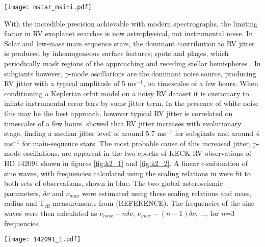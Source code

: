 \documentclass[useAMS, usenatbib]{aastex}
\begin{document}
\begin{figure*}
\begin{center}
\texttt{[image: mstar\_msini.pdf]}
\caption{Host star mass vs minimum masses for planets with orbital solutions
listed in the {\it Exoplanet.org}. In this study we are targeting the blue
region.}
\label{fig:mstar_msini}
\end{center}
\end{figure*}

With the incredible precision achievable with modern spectrographs, the
limiting factor in RV exoplanet searches is now astrophysical, not
instrumental noise.
In Solar and low-mass main sequence stars, the dominant contribution to RV
jitter is produced by inhomogeneous surface features; spots and plages, which
periodically mask regions of the approaching and receding stellar hemispheres \citep{Aigrain2012, Dumusque2011, Haywood2014}.
In subgiants however, p-mode oscillations are the dominant noise
source, producing RV jitter with a typical amplitude of 5 ms$^{-1}$, on
timescales of a few hours.
When conditioning a Keplerian orbit model on a noisy RV dataset it is
customary to inflate instrumental error bars by some jitter term. In the
presence of white noise this may be the best approach, however typical RV
jitter is correlated on timescales of a few hours.
\citep{Wright2005} showed that RV jitter increases with evolutionary stage,
finding a median jitter level of around 5.7 ms$^{-1}$ for subgiants and around
4 ms$^{-1}$ for main-sequence stars.
The most probable cause of this increased jitter, p-mode oscillations,
are apparent in the two epochs of KECK RV observations of
HD 142091 shown in figures \ref{fig:k2_1} and \ref{fig:k2_2}.
A linear combination of sine waves, with frequencies calculated using the
scaling relations in \citep{Kjeldsen1995} were fit to both sets of
observations, shown in blue.
The two global asteroseismic parameters, $\delta \nu$ and $\nu_{max}$ were
estimated using these scaling relations and mass, radius and T$_{\mathrm{eff}}$ measurements from (REFERENCE).
The frequencies of the sine waves were then calculated as $\nu_{max}-n\delta
\nu$, $\nu_{max}-(n-1)\delta \nu$, ..., for $n$=3 frequencies.

\begin{figure*}
\begin{center}
\texttt{[image: 142091\_1.pdf]}
\caption{KECK RV observations of HD 142091. A fit to the data using a linear
combination of 3 theoretical oscillation frequencies is shown in blue. The RMS
of the residuals is 1.36 ms$^{-1}$.}
\label{fig:k2_1}
\end{center}
\end{figure*}
\end{document}
